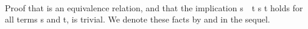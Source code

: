 \begin{code}%
\>[0]\<%
\\
\>[0][@{}l@{\AgdaIndent{1}}]%
\>[1]\AgdaSpace{}%
\AgdaSymbol{:}\AgdaSpace{}%
\AgdaSymbol{\{}\AgdaSpace{}%
\AgdaSymbol{:}\AgdaSpace{}%
\AgdaSpace{}%
\AgdaSymbol{\}(}\AgdaSpace{}%
\AgdaSpace{}%
\AgdaSymbol{:}\AgdaSpace{}%
\AgdaSpace{}%
\AgdaSymbol{)}\AgdaSpace{}%
\AgdaSpace{}%
\AgdaSpace{}%
\AgdaSymbol{\AgdaUnderscore{}}\<%
\\
%
\>[1]\AgdaSpace{}%
\AgdaSymbol{\{}\AgdaSpace{}%
\AgdaSymbol{=}\AgdaSpace{}%
\AgdaSymbol{\}}\AgdaSpace{}%
\AgdaSpace{}%
\AgdaSpace{}%
\AgdaSymbol{=}\AgdaSpace{}%
\AgdaSpace{}%
\AgdaSymbol{(}\AgdaSpace{}%
\AgdaSymbol{:}\AgdaSpace{}%
\AgdaSpace{}%
\AgdaSymbol{(}\AgdaSpace{}%
\AgdaSymbol{))}\AgdaSpace{}%
\AgdaSpace{}%
\AgdaSpace{}%
\AgdaSpace{}%
\AgdaSpace{}%
\AgdaSpace{}%
\AgdaSpace{}%
\AgdaSpace{}%
\AgdaSpace{}%
\AgdaSpace{}%
\AgdaSpace{}%
\AgdaSpace{}%
\<%
\\
\>[0]\<%
\end{code}
\ifshort
Proof that  is an equivalence relation, and that the implication \ab
s~~\ab t   \ab s \ab t holds for all terms \ab s and \ab t, is
trivial. %
We denote these facts by  and  in the sequel.
\else
